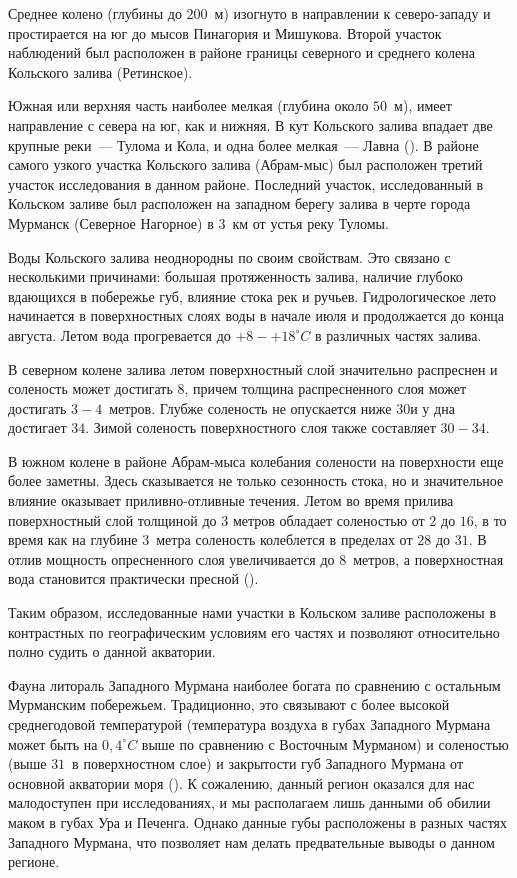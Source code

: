 Среднее колено (глубины до $200$~м) изогнуто в направлении к северо-западу и простирается на юг до мысов Пинагория и Мишукова. 
Второй участок наблюдений был расположен в районе границы северного и среднего колена Кольского залива (Ретинское).

Южная или верхняя часть наиболее мелкая (глубина около $50$~м), имеет направление с севера на юг, как и нижняя. 
В кут Кольского залива впадает две крупные реки~--- Тулома и Кола, и одна более мелкая~--- Лавна (\cite{Derugin_1915}).  
В районе самого узкого участка Кольского залива (Абрам-мыс) был расположен третий участок исследования в данном районе.
Последний участок, исследованный в Кольском заливе был расположен на западном берегу залива в черте города Мурманск (Северное Нагорное) в $3$~км от устья реку Туломы.

Воды Кольского залива неоднородны по своим свойствам. 
Это связано с несколькими причинами: большая протяженность залива, наличие глубоко вдающихся в побережье губ, влияние стока рек и ручьев. 
Гидрологическое лето начинается в поверхностных слоях воды в начале июля и продолжается до конца августа. 
Летом вода прогревается до $+8 - +18^{\circ}C$ в различных частях залива.

В  северном колене залива летом поверхностный слой значительно распреснен и соленость может достигать $8$\permil, причем толщина распресненного слоя может достигать $3-4$~метров. 
Глубже соленость не опускается ниже $30$\permil и у дна достигает $34$\permil. 
Зимой соленость поверхностного слоя также составляет $30 - 34$\permil. 

В южном колене в районе Абрам-мыса колебания солености на поверхности еще более заметны. 
Здесь сказывается не только сезонность стока, но и значительное влияние оказывает приливно-отливные течения. 
Летом во время прилива поверхностный слой толщиной до 3 метров обладает соленостью от $2$ до $16$\permil, в то время как на глубине $3$~метра соленость колеблется в пределах от $28$ до $31$\permil. 
В отлив мощность опресненного слоя увеличивается до $8$~метров, а поверхностная вода становится практически пресной (\cite{Derugin_1915}).

Таким образом, исследованные нами участки в Кольском заливе расположены в контрастных по географическим условиям его частях и позволяют относительно полно судить о данной акватории.

Фауна литораль Западного Мурмана наиболее богата по сравнению с остальным Мурманским побережьем. 
Традиционно, это связывают с более высокой среднегодовой температурой (температура воздуха в губах Западного Мурмана может быть на $0,4^{\circ}C$ выше по сравнению с Восточным Мурманом) и соленостью (выше $31$\permil\ в поверхностном слое) и закрытости губ Западного Мурмана от основной акватории моря (\cite{Guryanova_et_al_1930}). 
К сожалению, данный регион оказался для нас малодоступен при исследованиях, и мы располагаем лишь данными об обилии маком в губах Ура и Печенга.
Однако данные губы расположены в разных частях Западного Мурмана, что позволяет нам делать предвательные выводы о данном регионе.

